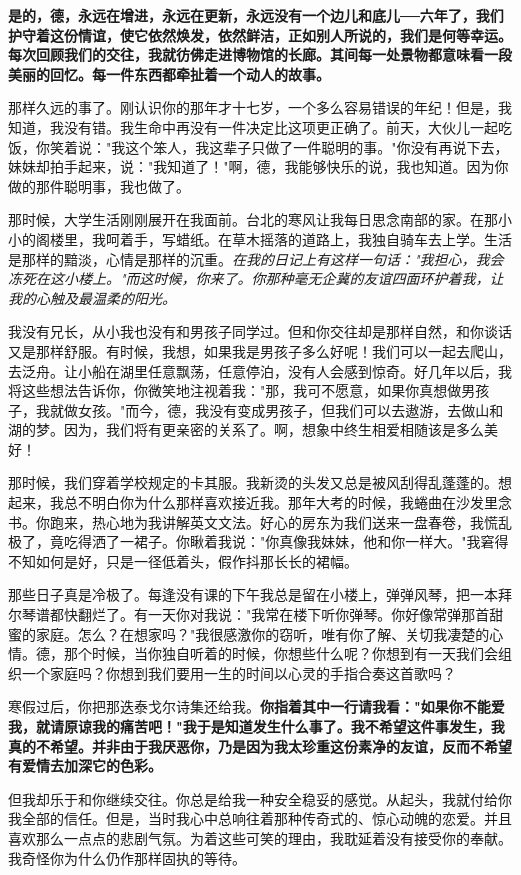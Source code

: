 \documentclass[UTF8,a4paper,8pt]{ctexbook}
\begin{document}
		\textbf{是的，德，永远在增进，永远在更新，永远没有一个边儿和底儿──六年了，我们护守着这份情谊，使它依然焕发，依然鲜洁，正如别人所说的，我们是何等幸运。每次回顾我们的交往，我就彷佛走进博物馆的长廊。其间每一处景物都意味看一段美丽的回忆。每一件东西都牵扯着一个动人的故事。}
		
		那样久远的事了。刚认识你的那年才十七岁，一个多么容易错误的年纪！但是，我知道，我没有错。我生命中再没有一件决定比这项更正确了。前天，大伙儿一起吃饭，你笑着说："我这个笨人，我这辈子只做了一件聪明的事。"你没有再说下去，妹妹却拍手起来，说："我知道了！"啊，德，我能够快乐的说，我也知道。因为你做的那件聪明事，我也做了。
		
		那时候，大学生活刚刚展开在我面前。台北的寒风让我每日思念南部的家。在那小小的阁楼里，我呵着手，写蜡纸。在草木摇落的道路上，我独自骑车去上学。生活是那样的黯淡，心情是那样的沉重。\textit{在我的日记上有这样一句话："我担心，我会冻死在这小楼上。"而这时候，你来了。你那种毫无企冀的友谊四面环护着我，让我的心触及最温柔的阳光。}
		
		我没有兄长，从小我也没有和男孩子同学过。但和你交往却是那样自然，和你谈话又是那样舒服。有时候，我想，如果我是男孩子多么好呢！我们可以一起去爬山，去泛舟。让小船在湖里任意飘荡，任意停泊，没有人会感到惊奇。好几年以后，我将这些想法告诉你，你微笑地注视着我："那，我可不愿意，如果你真想做男孩子，我就做女孩。"而今，德，我没有变成男孩子，但我们可以去遨游，去做山和湖的梦。因为，我们将有更亲密的关系了。啊，想象中终生相爱相随该是多么美好！
		
		那时候，我们穿着学校规定的卡其服。我新烫的头发又总是被风刮得乱蓬蓬的。想起来，我总不明白你为什么那样喜欢接近我。那年大考的时候，我蜷曲在沙发里念书。你跑来，热心地为我讲解英文文法。好心的房东为我们送来一盘春卷，我慌乱极了，竟吃得洒了一裙子。你瞅着我说："你真像我妹妹，他和你一样大。"我窘得不知如何是好，只是一径低着头，假作抖那长长的裙幅。
		
		那些日子真是冷极了。每逢没有课的下午我总是留在小楼上，弹弹风琴，把一本拜尔琴谱都快翻烂了。有一天你对我说："我常在楼下听你弹琴。你好像常弹那首甜蜜的家庭。怎么？在想家吗？"我很感激你的窃听，唯有你了解、关切我凄楚的心情。德，那个时候，当你独自听着的时候，你想些什么呢？你想到有一天我们会组织一个家庭吗？你想到我们要用一生的时间以心灵的手指合奏这首歌吗？
		
		寒假过后，你把那迭泰戈尔诗集还给我。\textbf{你指着其中一行请我看："如果你不能爱我，就请原谅我的痛苦吧！"我于是知道发生什么事了。我不希望这件事发生，我真的不希望。并非由于我厌恶你，乃是因为我太珍重这份素净的友谊，反而不希望有爱情去加深它的色彩。}
		
		但我却乐于和你继续交往。你总是给我一种安全稳妥的感觉。从起头，我就付给你我全部的信任。但是，当时我心中总响往着那种传奇式的、惊心动魄的恋爱。并且喜欢那么一点点的悲剧气氛。为着这些可笑的理由，我耽延着没有接受你的奉献。我奇怪你为什么仍作那样固执的等待。
		
\end{document}
